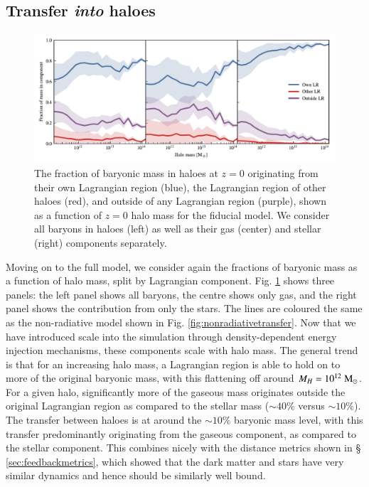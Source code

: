 \subsection{Transfer \emph{into} haloes}
\label{sec:transferinto}


\begin{figure}
	\centering
	\includegraphics{figures/s50j7kAHF/component_fraction_mixed.pdf}
	\vspace{-0.7cm}
	\caption{
  The fraction of baryonic mass in haloes at $z=0$ originating from their own
  Lagrangian region (blue), the Lagrangian region of other haloes (red), and
  outside of any Lagrangian region (purple), shown as a function of $z=0$
  halo mass for the fiducial \simba{} model. We consider all baryons in
  haloes (left) as well as their gas (center) and stellar (right) components
  separately.
	}
	\label{fig:maintransferresult}
\end{figure}

Moving on to the full \simba{} model, we consider again the fractions of
baryonic mass as a function of halo mass, split by Lagrangian component. Fig.
\ref{fig:maintransferresult} shows three panels: the left panel shows all
baryons, the centre shows only gas, and the right panel shows the
contribution from only the stars. The lines are coloured the same as the
non-radiative model shown in Fig. \ref{fig:nonradiativetransfer}. Now that we
have introduced scale into the simulation through density-dependent energy
injection mechanisms, these components scale with halo mass. The general
trend is that for an increasing halo mass, a Lagrangian region is able to
hold on to more of the original baryonic mass, with this flattening off
around $M_H = 10^{12} \;{\rm M}_{\odot}$. For a given halo, significantly more of the
gaseous mass originates outside the original Lagrangian region as compared to
the stellar mass ($\sim 40 \%$ versus $\sim 10 \%$). The transfer between
haloes is at around the $\sim 10\%$ baryonic mass level, with this transfer
predominantly originating from the gaseous component, as compared to the
stellar component. This combines nicely with the distance metrics shown in \S
\ref{sec:feedbackmetrics}, which showed that the dark matter and stars have
very similar dynamics and hence should be similarly well bound.


